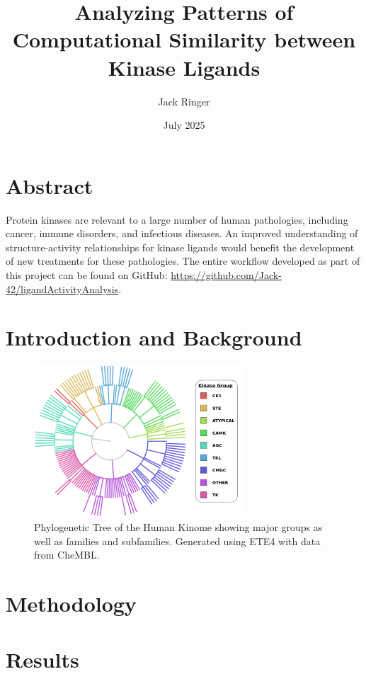\documentclass[11pt]{article}
\title{Analyzing Patterns of Computational Similarity between Kinase Ligands}
\author{Jack Ringer}
\date{July 2025}
\begin{document}
\maketitle


\section*{Abstract}
Protein kinases are relevant to a large number of human pathologies, including cancer, immune disorders, and infectious diseases. An improved understanding of structure-activity relationships for kinase ligands would benefit the development of new treatments for these pathologies. The entire workflow developed as part of this project can be found on GitHub: \href{https://github.com/Jack-42/ligandActivityAnalysis}{https://github.com/Jack-42/ligandActivityAnalysis}.


\section*{Introduction and Background}

\begin{figure}[H]
    \centering
    \includegraphics[width=0.7\textwidth]{../figures/protein_family_tree.png}
    \caption{Phylogenetic Tree of the Human Kinome showing major groups as well as families and subfamilies. Generated using ETE4 with data from CheMBL.}
    \label{fam_tree}
\end{figure}


\section*{Methodology}

\section*{Results}
\end{document}
